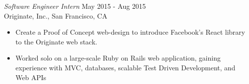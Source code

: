 {\sl Software Engineer Intern} \hfill May 2015 - Aug 2015 \\
Originate, Inc., San Francisco, CA
\begin{itemize} \itemsep -2pt %
\item Create a Proof of Concept web-design to introduce Facebook's React library to the Originate web stack.
\item Worked solo on a large-scale Ruby on Rails web application, gaining experience with MVC, databases, scalable Test Driven Development, and Web APIs
\end{itemize}
